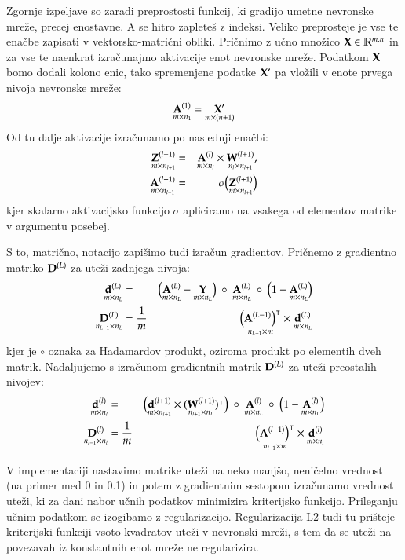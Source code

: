 Zgornje izpeljave so zaradi preprostosti funkcij, ki gradijo umetne nevronske mreže, precej enostavne. A se hitro zapleteš z indeksi. Veliko preprosteje je vse te enačbe zapisati v vektorsko-matrični obliki. Pričnimo z učno množico $\mathbf{X}\in\mathbb{R}^{m,n}$ in za vse te naenkrat izračunajmo aktivacije enot nevronske mreže. Podatkom $\mathbf{X}$bomo dodali kolono enic, tako spremenjene podatke $\mathbf{X}'$ pa vložili v enote prvega nivoja nevronske mreže:
\begin{equation}
  \underset{m \times n_1}{\mathbf{A}^{(1)}} = \underset{m\times(n+1)}{\mathbf{X}'}
\end{equation}
\noindent Od tu dalje aktivacije izračunamo po naslednji enačbi:
\begin{eqnarray}
  \underset{m\times n_{l+1}}{\mathbf{Z}^{(l+1)}} & = & \underset{m\times n_l}{\mathbf{A}^{(l)}} \times \underset{n_l\times n_{l+1}}{\mathbf{W}^{(l+1)}}, \\
  \underset{m\times n_{l+1}}{\mathbf{A}^{(l+1)}} & = & \sigma\big(\underset{m\times n_{l+1}}{\mathbf{Z}^{(l+1)}}\big)
\end{eqnarray}
\noindent kjer skalarno aktivacijsko funkcijo $\sigma$ apliciramo na vsakega od elementov matrike v argumentu posebej.

S to, matrično, notacijo zapišimo tudi izračun gradientov. Pričnemo z gradientno matriko $\mathbf{D}^{(L)}$ za uteži zadnjega nivoja:
\begin{eqnarray}
  \underset{m\times n_L}{\matr{d}^{(L)}} & = & 
  \big(\underset{m\times n_L}{\matr{A}^{(L)}}-\underset{m\times n_L}{\matr{Y}}\big) 
  \ \circ\  \underset{m\times n_L}{\matr{A}^{(L)}} \ \circ \ \big(1-\underset{m\times n_L}{\matr{A}^{(L)}}\big) \\
%
  \underset{n_{L-1}\times n_L}{\matr{D}^{(L)}} & = {1\over m} & 
  \underset{n_{L-1}\times m}{\big(\matr{A}^{(L-1)}\big)^\tr} \times
  \underset{m\times n_L}{\matr{d}^{(L)}}
\end{eqnarray}
kjer je $\circ$ oznaka za Hadamardov produkt, oziroma produkt po elementih dveh matrik. Nadaljujemo s izračunom gradientnih matrik $\mathbf{D}^{(L)}$ za uteži preostalih nivojev:
\begin{eqnarray}
  \underset{m\times n_l}{\matr{d}^{(l)}} & = & 
  \big(\underset{m\times n_{l+1}} {\matr{d}^{(l+1)}}\times (\underset{n_{l+1}\times n_L}{\matr{W}^{(l+1)}})^\tr\big) 
  \ \circ\  \underset{m\times n_L}{\matr{A}^{(l)}} \ \circ \ \big(1-\underset{m\times n_L}{\matr{A}^{(l)}}\big) \\
%
  \underset{n_{l-1}\times n_l}{\matr{D}^{(l)}} & = {1\over m} & 
  \underset{n_{l-1}\times m}{\big(\matr{A}^{(l-1)}\big)^\tr} \times
  \underset{m\times n_l}{\matr{d}^{(l)}}
\end{eqnarray}

V implementaciji nastavimo matrike uteži na neko manjšo, neničelno vrednost (na primer med 0 in 0.1) in potem z gradientnim sestopom izračunamo vrednost uteži, ki za dani nabor učnih podatkov minimizira kriterijsko funkcijo. Prileganju učnim podatkom se izogibamo z regularizacijo. Regularizacija L2 tudi tu prišteje kriterijski funkciji vsoto kvadratov uteži v nevronski mreži, s tem da se uteži na povezavah iz konstantnih enot mreže ne regularizira.
